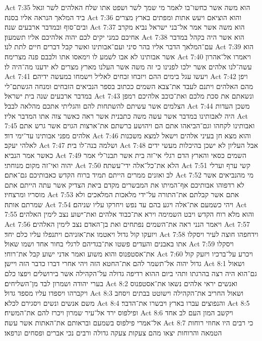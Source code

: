 Act 7:35  הוא משה אשר כחשו־בו לאמר מי שמך לשר ושפט אתו שלח האלהים לשר וגאל ביד המלאך הנראה אליו בסנה׃
Act 7:36  והוא הוציאם ויעש אתות ומפתים בארץ מצרים ובים־סוף ובמדבר ארבעים שנה׃
Act 7:37  הוא משה אשר אמר אל־בני ישראל נביא מקרב אחיכם כמני יקים לכם יהוה אלהיכם אליו תשמעון׃
Act 7:38  הוא אשר היה בקהל במדבר עם־המלאך הדבר אליו בהר סיני ועם־אבותינו ואשר קבל דברים חיים לתת לנו׃
Act 7:39  הוא אשר אבותינו לא אבו לשמע לו וימאסו אתו ולבבם פנה מצרימה׃
Act 7:40  ויאמרו אל־אהרון עשה־לנו אלהים אשר ילכו לפנינו כי זה משה אשר העלנו מארץ מצרים לא ידענו מה־היה לו׃
Act 7:41  ויעשו עגל בימים ההם ויזבחו זבחים לאליל וישמחו במעשה ידיהם׃
Act 7:42  ויפן מהם האלהים ויתנם לעבד את־צבא השמים ככתוב בספר הנביאים הזבחים ומנחה הגשתם־לי במדבר ארבעים שנה בית ישראל׃
Act 7:43  ונשאתם את סכת מלכם ואת־כוכב אלהיכם רמפן הצלמים אשר עשיתם להשתחות להם והגליתי אתכם מהלאה לבבל׃
Act 7:44  משכן העדות היה לאבותינו במדבר אשר עשה משה כתבנית אשר ראה כאשר צוה אתו המדבר אליו׃
Act 7:45  ואבותינו לקחהו וגם־הביאהו אתם הם ויהושע ברשתם את־ארצות הגוים אשר גרש אתם אלהים מפני אבותינו עד־ימי דוד׃
Act 7:46  והוא מצא חן בעיני אלהים וישאל למצא משכנות לאלהי יעקב׃
Act 7:47  ושלמה בנה־לו בית׃
Act 7:48  אבל העליון לא ישכן בהיכלות מעשי ידים כאשר אמר הנביא׃
Act 7:49  השמים כסאי והארץ הדם רגלי אי־זה בית אשר תבנו־לי אמר יהוה ואי־זה מקום מנוחתי׃
Act 7:50  הלא את־כל־אלה ידי־עשתה׃
Act 7:51  קשי ערף וערלי לב ואזנים ממרים הייתם תמיד ברוח הקדש כאבותיכם גם־אתם׃
Act 7:52  מי מהנביאים אשר לא רדפוהו אבותיכם אף־המיתו את המבשרים מקדם ביאת הצדיק אשר עתה הייתם אתם מוסריו ומרצחיו׃
Act 7:53  אתם אשר קבלתם את־התורה על־ידי מלאכות המלאכים ולא שמרתם אותה׃
Act 7:54  ויהי כשמעם את־אלה ויגע בהם עד נפש ויחרקו עליו שניהם׃
Act 7:55  והוא מלא רוח הקדש ויבט השמימה וירא את־כבוד אלהים ואת־ישוע נצב לימין האלהים׃
Act 7:56  ויאמר הנני ראה את־השמים נפתחים ואת בן־האדם נצב לימין האלהים׃
Act 7:57  ויזעקו קול גדול ויאטמו את־אזניהם ויתנפלו עליו כלם יחד׃
Act 7:58  וידחפהו חוצה לעיר ויסקלו אתו באבנים והעדים פשטו את־בגדיהם לרגלי בחור אחד ושמו שאול׃
Act 7:59  ויסקלו את־אסטפנוס והוא משוע ואמר אדני ישוע קבל את־רוחי׃
Act 7:60  ויכרע על־ברכיו ויזעק קול גדול יהוה אל־תשמר להם את־החטא הזה ויהי אחרי דברו כדבר הזה ויישן׃
Act 8:1  ושאול גם־הוא היה רצה בהרגתו ותהי ביום ההוא רדיפה גדולה על־הקהילה אשר בירושלים ויפצו כלם בערי יהודה ושמרון לבד מן־השליחים׃
Act 8:2  ואנשים יראי אלהים נשאו את־אסטפנוס ויקברהו ויספדו עליו מספד גדול׃
Act 8:3  ושאול החריב את־הקהילה וישוטט בבתים ויסחב משם אנשים ונשים ויסגירם לכלא׃
Act 8:4  והנפוצים עברו בארץ ויבשרו את־הדבר׃
Act 8:5  ופילפוס ירד אל־עיר שמרון ויכרז להם את־המשיח׃
Act 8:6  ויקשב המון העם לב אחד אל־אמרי פילפוס בשמעם ובראותם את־האתות אשר עשה׃
Act 8:7  כי רבים היו אחוזי רוחות הטמאה והרוחות יצאו מהם צעקות צעקה גדולה ורבים נכי אברים ופסחים ונרפאו׃
